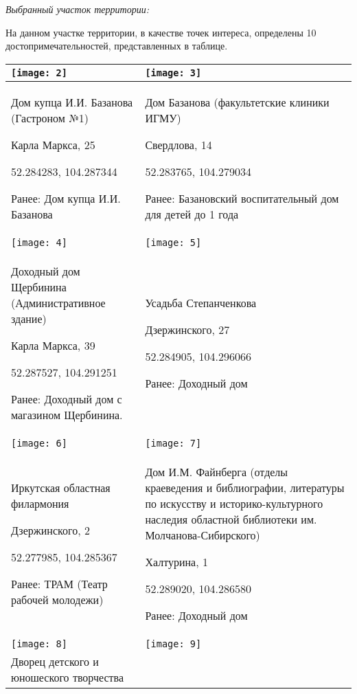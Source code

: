 \solutionSection

\textit{Выбранный участок территории:}


На данном участке территории, в качестве точек интереса, определены 10 достопримечательностей, представленных в таблице.

\begin{tabular}{|p{8cm}|p{8cm}|}
    \hline
    \texttt{[image: 2]} & \texttt{[image: 3]} \\
    \hline
    Дом купца И.И. Базанова  (Гастроном №1)

    Карла Маркса, 25 
    
    52.284283, 104.287344
    
    Ранее: Дом купца И.И. Базанова & Дом Базанова (факультетские клиники ИГМУ) 

    Свердлова, 14 

    52.283765, 104.279034

    Ранее: Базановский воспитательный дом для детей до 1 года \\
    \hline
    \texttt{[image: 4]} & \texttt{[image: 5]} \\
    \hline
    Доходный дом Щербинина (Административное здание)

    Карла Маркса, 39 

    52.287527, 104.291251

    Ранее: Доходный дом с магазином Щербинина. & Усадьба Степанченкова 

    Дзержинского, 27 

    52.284905, 104.296066

    Ранее: Доходный дом  \\
    \hline
    \texttt{[image: 6]} & \texttt{[image: 7]} \\
    \hline
    Иркутская областная филармония 
    
    Дзержинского, 2 
    
    52.277985, 104.285367
    
    Ранее: ТРАМ (Театр рабочей молодежи) & Дом И.М. Файнберга  (отделы краеведения и библиографии, литературы по искусству и историко-культурного наследия областной библиотеки им. Молчанова-Сибирского)

    Халтурина, 1 

    52.289020, 104.286580

    Ранее: Доходный дом \\
    \hline
    \texttt{[image: 8]} & \texttt{[image: 9]} \\
    \hline
    Дворец детского и юношеского творчества 
    

\end{tabular}
